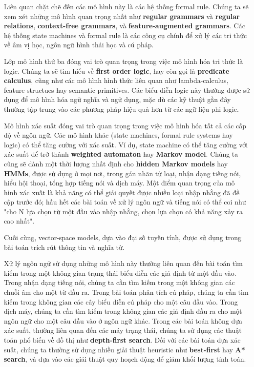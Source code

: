 Liên quan chặt chẽ đến các mô hình này là các hệ thống formal rule. Chúng ta sẽ xem xét những mô hình quan trọng nhất như \textbf{regular grammars} và \textbf{regular relations}, \textbf{context-free grammars}, và \textbf{feature-augmented grammars}. Các hệ thống state machines và formal rule là các công cụ chính để xử lý các tri thức về âm vị học, ngôn ngữ hình thái học và cú pháp.

Lớp mô hình thứ ba đóng vai trò quan trọng trong việc mô hình hóa tri thức là logic. Chúng ta sẽ tìm hiểu về \textbf{first order logic}, hay còn gọi là \textbf{predicate calculus}, cũng như các mô hình hình thức liên quan như lambda-calculus, feature-structues hay semantic primitives. Các biểu diễn logic này thường được sử dụng để mô hình hóa ngữ nghĩa và ngữ dụng, mặc dù các kỹ thuật gần đây thường tập trung vào các phương pháp hiệu quả hơn từ các ngữ liệu phi logic.

Mô hình xác suất đóng vai trò quan trọng trong việc mô hình hóa tất cả các cấp độ về ngôn ngữ. Các mô hình khác (state machines, formal rule systems hay logic) có thể tăng cường với xác suất. Ví dụ, state machine có thể tăng cường với xác suất để trở thành \textbf{weighted automaton} hay \textbf{Markov model}. Chúng ta cũng sẽ dành một thời lượng nhất định cho \textbf{hidden Markov models} hay \textbf{HMMs}, được sử dụng ở mọi nơi, trong gán nhãn từ loại, nhận dạng tiếng nói, hiểu hội thoại, tổng hợp tiếng nói và dịch máy. Một điểm quan trọng của mô hình xác xuất là khả năng có thể giải quyết được nhiều loại nhập nhằng đã đề cập trước đó; hầu hết các bài toán về xử lý ngôn ngữ và tiếng nói có thể coi như "cho N lựa chọn từ một đầu vào nhập nhằng, chọn lựa chọn có khả năng xảy ra cao nhất".

Cuối cùng, vector-space models, dựa vào đại số tuyến tính, được sử dụng trong bài toán trích rút thông tin và nghĩa từ.

Xử lý ngôn ngữ sử dụng những mô hình này thường liên quan đến bài toán tìm kiếm trong một không gian trạng thái biểu diễn các giả định từ một đầu vào. Trong nhận dạng tiếng nói, chúng ta cần tìm kiếm trong một không gian các chuỗi âm cho một từ đầu ra. Trong bài toán phân tích cú pháp, chúng ta cần tìm kiếm trong không gian các cây biểu diễn cú pháp cho một câu đầu vào. Trong dịch máy, chúng ta cần tìm kiếm trong không gian các giả định đầu ra cho một ngôn ngữ cho một câu đầu vào ở ngôn ngữ khác. Trong các bài toán không dựa xác suất, thường liên quan đến các máy trạng thái, chúng ta sử dụng các thuật toán phổ biến về đồ thị như \textbf{depth-first search}. Đối với các bài toán dựa xác suất, chúng ta thường sử dụng nhiều giải thuật heuristic như \textbf{best-first} hay \textbf{A* search}, và dựa vào các giải thuật quy hoạch động để giảm khối lượng tính toán.


